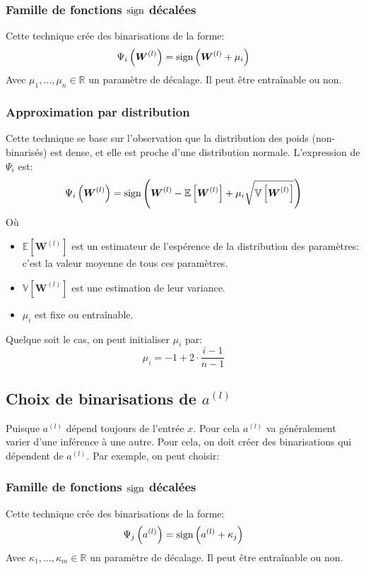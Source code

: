 \subsubsection{Famille de fonctions $\operatorname{sign}$ décalées } 
Cette technique crée des binarisations de la forme:
\begin{equation}
	\Psi_i\left(\boldsymbol{W}^{(l)}\right) = \operatorname{sign} \left( \boldsymbol{W}^{(l)} +\mu_i\right) 
\end{equation}
Avec $\mu_1,\dots,\mu_n\in\mathbb{R}$ un paramètre de décalage. Il peut être entraînable ou non.

\subsubsection{Approximation par distribution}
Cette technique se base sur l'observation que la distribution des poids (non-binarisés) est dense\cite{ABCNetPaper}, et elle est proche d'une distribution normale. L'expression de $\Psi_i$ est:
\begin{equation}
	\Psi_i\left(\boldsymbol{W}^{(l)}\right)=\operatorname{sign}\left( \boldsymbol{W}^{(l)}-\mathbb{E}\left[ \boldsymbol{W}^{(l)} \right] + \mu_i \sqrt{\mathbb{V}\left[ \boldsymbol{W}^{(l)} \right]}\right)
\end{equation}
Où \begin{itemize}
	\item $\mathbb{E}\left[ \boldsymbol{W}^{(l)} \right]$ est un estimateur de l'espérence de la distribution des paramètres: c'est la valeur moyenne de tous ces paramètres.
	\item  $\mathbb{V}\left[ \boldsymbol{W}^{(l)} \right]$ est une estimation de leur variance.
	\item $\mu_i$ est fixe ou entraînable.
\end{itemize}
Quelque soit le cas, on peut initialiser $\mu_i$\cite{ABCNetPaper} par:
\begin{equation}
	\mu_i=-1+2\cdot \frac{i-1}{n-1}
\end{equation}

\subsection{Choix de binarisations de $a^{(l)}$}
Puisque $a^{(l)}$ dépend toujours de l'entrée $x.$ Pour cela $a^{(l)}$ va généralement varier d'une inférence à une autre.
\newline Pour cela, on doit créer des binarisations qui dépendent de $a^{(l)}.$ Par exemple, on peut choisir:
\subsubsection{Famille de fonctions $\operatorname{sign}$ décalées}
Cette technique crée des binarisations de la forme:
\begin{equation}
	\Psi_j\left(a^{(l)}\right) = \operatorname{sign} \left( a^{(l)} +\kappa_j\right) 
\end{equation}
Avec $\kappa_1,\dots,\kappa_m\in\mathbb{R}$ un paramètre de décalage. Il peut être entraînable ou non.


